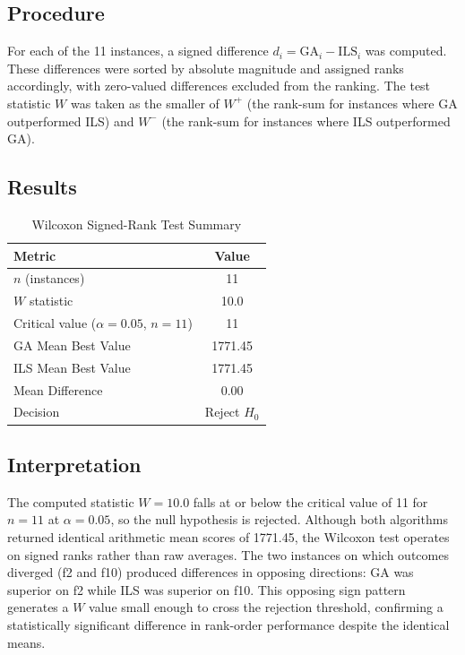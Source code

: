 \documentclass[12pt, a4paper]{article}
\begin{document}
\subsection{Procedure}

For each of the 11 instances, a signed difference $d_i = \mathrm{GA}_i - \mathrm{ILS}_i$ was computed. These differences were sorted by absolute magnitude and assigned ranks accordingly, with zero-valued differences excluded from the ranking. The test statistic $W$ was taken as the smaller of $W^{+}$ (the rank-sum for instances where GA outperformed ILS) and $W^{-}$ (the rank-sum for instances where ILS outperformed GA).

\subsection{Results}

\vspace{0.5em}
\begin{table}[ht]
    \centering
    \begin{tabular}{lc}
        \toprule
        \textbf{Metric} & \textbf{Value} \\
        \midrule
        $n$ (instances)                          & 11 \\
        $W$ statistic                            & 10.0 \\
        Critical value ($\alpha = 0.05$, $n=11$) & 11 \\
        GA Mean Best Value                       & 1771.45 \\
        ILS Mean Best Value                      & 1771.45 \\
        Mean Difference                          & 0.00 \\
        Decision                                 & Reject $H_0$ \\
        \bottomrule
    \end{tabular}
    \caption{Wilcoxon Signed-Rank Test Summary}
\end{table}

\subsection{Interpretation}

The computed statistic $W = 10.0$ falls at or below the critical value of 11 for $n = 11$ at $\alpha = 0.05$, so the null hypothesis is rejected. Although both algorithms returned identical arithmetic mean scores of 1771.45, the Wilcoxon test operates on signed ranks rather than raw averages. The two instances on which outcomes diverged (f2 and f10) produced differences in opposing directions: GA was superior on f2 while ILS was superior on f10. This opposing sign pattern generates a $W$ value small enough to cross the rejection threshold, confirming a statistically significant difference in rank-order performance despite the identical means.
\end{document}
